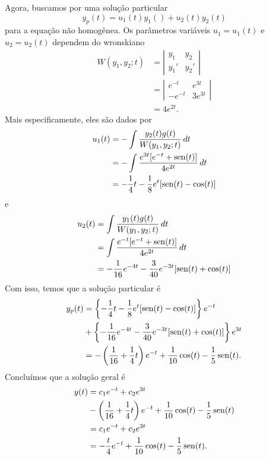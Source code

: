 \begin{resol}
  Agora, buscamos por uma solução particular
  \begin{equation}
    y_p(t) = u_1(t)y_1() + u_2(t)y_2(t)
  \end{equation}
  para a equação não homogênea. Os parâmetros variáveis $u_1 = u_1(t)$ e $u_2 = u_2(t)$ dependem do wronskiano
  \begin{align}
    W(y_1,y_2;t) &= \left|
                   \begin{matrix}
                     y_1 & y_2 \\
                     y_1' & y_2'
                   \end{matrix}
                            \right| \\
                 &= \left|
                   \begin{matrix}
                     e^{-t} & e^{3t} \\
                     -e^{-t} & 3e^{3t}
                   \end{matrix}
                               \right| \\
                 &= 4e^{2t}.
  \end{align}
  Mais especificamente, eles são dados por
  \begin{align}
    u_1(t) &= -\int \frac{y_2(t)g(t)}{W(y_1,y_2;t)}\,dt \\
           &= -\int \frac{e^{3t}[e^{-t} + \operatorname{sen}(t)]}{4e^{2t}}\,dt \\
           &= -\frac{1}{4}t - \frac{1}{8}e^{t}[\operatorname{sen}(t) - \cos(t)]
  \end{align}
  e
  \begin{align}
    u_2(t) &= \int \frac{y_1(t)g(t)}{W(y_1,y_2;t)}\,dt \\
           &= \int \frac{e^{-t}[e^{-t} + \operatorname{sen}(t)]}{4e^{2t}}\,dt \\
           &= -\frac{1}{16}e^{-4t} - \frac{3}{40}e^{-3t}[\operatorname{sen}(t) + \cos(t)]
  \end{align}
  Com isso, temos que a solução particular é
  \begin{align}
    y_p(t) &= \left\{-\frac{1}{4}t - \frac{1}{8}e^{t}[\operatorname{sen}(t) - \cos(t)]\right\}e^{-t} \\
           &+ \left\{-\frac{1}{16}e^{-4t} - \frac{3}{40}e^{-3t}[\operatorname{sen}(t) + \cos(t)]\right\}e^{3t} \\
           &= -\left(\frac{1}{16}+\frac{1}{4}t\right)e^{-t} + \frac{1}{10}\cos(t) - \frac{1}{5}\operatorname{sen}(t).
  \end{align}
  Concluímos que a solução geral é
  \begin{align}
    y(t) &= c_1e^{-t} + c_2e^{3t} \\
         &- \left(\frac{1}{16}+\frac{1}{4}t\right)e^{-t} + \frac{1}{10}\cos(t) - \frac{1}{5}\operatorname{sen}(t) \\
         &= c_1e^{-t} + c_2e^{3t} \\
         &= -\frac{t}{4}e^{-t} + \frac{1}{10}\cos(t) - \frac{1}{5}\operatorname{sen}(t).
  \end{align}
\end{resol}

